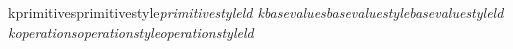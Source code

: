 \ifdefined{}
  \expandafter\geometry\expandafter{\geometryparams}
\fi

\fancyhf{}
\renewcommand{\headrulewidth}{0pt}

\pagestyle{fancy}


\makeatletter
\lst@InstallFamily k{primitives}{primitivestyle}\slshape{primitivestyle}{}ld
\lst@InstallFamily k{basevalues}{basevaluestyle}\slshape{basevaluestyle}{}ld
\lst@InstallFamily k{operations}{operationstyle}\slshape{operationstyle}{}ld
\makeatother


